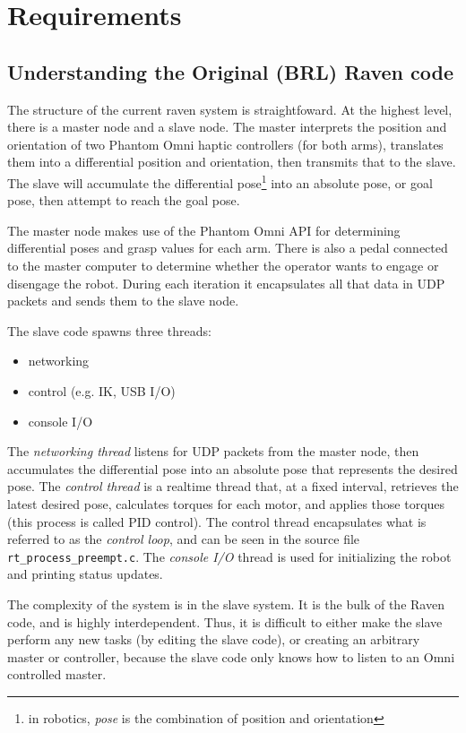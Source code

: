 \documentclass[letterpaper,twocolumn,10pt]{article}
\begin{document}
\section{Requirements}

\subsection{Understanding the Original (BRL) Raven code}

The structure of the current raven system is straightfoward. At the
highest level, there is a master node and a slave node. The master
interprets the position and orientation of two Phantom Omni haptic
controllers (for both arms), translates them into a differential
position and orientation, then transmits that to the slave. The slave
will accumulate the differential pose\footnote{in robotics, \emph{pose}
  is the combination of position and orientation} into an absolute
pose, or goal pose, then attempt to reach the goal pose.

The master node makes use of the Phantom Omni API for determining
differential poses and grasp values for each arm. There is also a
pedal connected to the master computer to determine whether the
operator wants to engage or disengage the robot. During each iteration
it encapsulates all that data in UDP packets and sends them to the
slave node.

\vspace{0.5em}
\noindent
The slave code spawns three threads:
\begin{itemize}[noitemsep]
  \item networking
  \item control (e.g. IK, USB I/O)
  \item console I/O
\end{itemize}

The \emph{networking thread} listens for UDP packets from the master
node, then accumulates the differential pose into an absolute pose
that represents the desired pose. The \emph{control thread} is a
realtime thread that, at a fixed interval, retrieves the latest
desired pose, calculates torques for each motor, and applies those
torques (this process is called PID control). The control thread
encapsulates what is referred to as the \emph{control loop}, and can
be seen in the source file \texttt{rt\_process\_preempt.c}. The
\emph{console I/O} thread is used for initializing the robot and
printing status updates.

The complexity of the system is in the slave system. It is the bulk 
of the Raven code, and is highly interdependent. Thus, it is difficult 
to either make the slave perform any new tasks (by editing the slave 
code), or creating an arbitrary master or controller, because the 
slave code only knows how to listen to an Omni controlled master.
\end{document}
